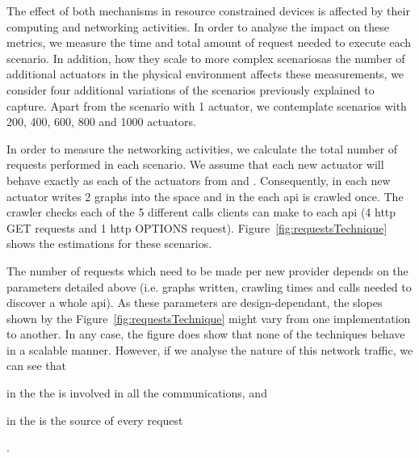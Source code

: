 


\bigskip

The effect of both mechanisms in resource constrained devices is affected by their computing and networking activities.
In order to analyse the impact on these metrics, we measure the time and total amount of request needed to execute each scenario.
In addition,  how they scale to more complex scenariosas the number of additional actuators in the physical environment affects these measurements,
we consider four additional variations of the scenarios previously explained to capture.
Apart from the scenario with 1 actuator, we contemplate scenarios with 200, 400, 600, 800 and 1000 actuators.


In order to measure the networking activities, we calculate the total number of requests performed in each scenario.
We assume that each new actuator will behave exactly as each of the actuators from \implSpace{} and \implRest{}.
Consequently, in \spaceActuation{} each new actuator writes 2 graphs into the space and in the \restActuation{} each \ac{api} is crawled once.
The crawler checks each of the 5 different calls clients can make to each \ac{api} (4 \acs{http} GET requests and 1 \acs{http} OPTIONS request).
Figure~\ref{fig:requestsTechnique} shows the estimations for these scenarios.




The number of requests which need to be made per new provider depends on the parameters detailed above (i.e. graphs written, crawling times and calls needed to discover a whole \ac{api}).
As these parameters are design-dependant, the slopes shown by the Figure~\ref{fig:requestsTechnique} might vary from one implementation to another.
In any case, the figure does show that none of the techniques behave in a scalable manner.
However, if we analyse the nature of this network traffic, we can see that
\begin{enumerate*}[label=\itshape\bfseries(\arabic*\upshape)]
  \item in the \spaceActuation{} the \Space{} is involved in all the communications, and
  \item in the \restActuation{} \nodeConsRest{} is the source of every request
\end{enumerate*}.


